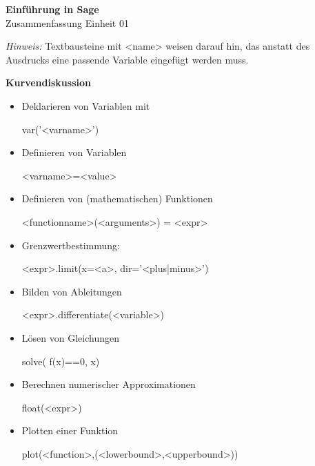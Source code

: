 \documentclass[a4paper,9pt,DIV15,twocolumn]{scrartcl}
\begin{document}
\begin{center}
    \textbf{\LARGE Einf\"uhrung in Sage}\\
    {\large Zusammenfassung Einheit 01}
\end{center}
\textsl{Hinweis:} Textbausteine mit <name> weisen darauf hin, das anstatt des Ausdrucks eine passende Variable eingefügt werden muss.

\medskip
\textbf{Kurvendiskussion}
\begin{itemize}
 \item Deklarieren von Variablen mit 
\begin{sagein}
var('<varname>')
\end{sagein}
\item Definieren von Variablen 
    \begin{sagein}
<varname>=<value>        
    \end{sagein}
\item Definieren von (mathematischen) Funktionen 
    \begin{sagein}
<functionname>(<arguments>) = <expr>
    \end{sagein}
\item Grenzwertbestimmung:
    \begin{sagein}
<expr>.limit(x=<a>, dir='<plus|minus>')
    \end{sagein}
\item Bilden von Ableitungen
\begin{sagein}
<expr>.differentiate(<variable>)
\end{sagein}

\item Lösen von Gleichungen
\begin{sagein}
solve( f(x)==0, x)
\end{sagein}

\item Berechnen numerischer Approximationen
\begin{sagein}
float(<expr>)
\end{sagein}
\item Plotten einer Funktion 
\begin{sagein}
plot(<function>,(<lowerbound>,<upperbound>))
\end{sagein}
\end{itemize}
\end{document}
